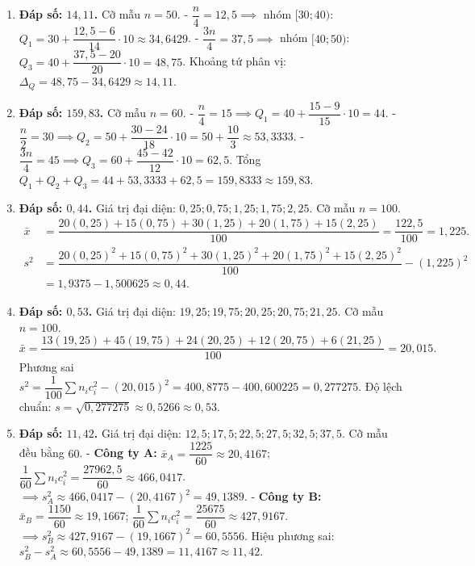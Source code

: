 \documentclass[12pt,a4paper]{article}
\begin{document}
\begin{enumerate}[start=11]
\item \textbf{Đáp số: $14{,}11$.}  
Cỡ mẫu $n = 50$.  
- $\dfrac{n}{4} = 12{,}5 \implies$ nhóm $[30; 40)$: $Q_1 = 30 + \dfrac{12{,}5 - 6}{14} \cdot 10 \approx 34{,}6429$.  
- $\dfrac{3n}{4} = 37{,}5 \implies$ nhóm $[40; 50)$: $Q_3 = 40 + \dfrac{37{,}5 - 20}{20} \cdot 10 = 48{,}75$.  
Khoảng tứ phân vị: $\Delta_Q = 48{,}75 - 34{,}6429 \approx 14{,}11$.

\item \textbf{Đáp số: $159{,}83$.}  
Cỡ mẫu $n = 60$.  
- $\dfrac{n}{4} = 15 \implies Q_1 = 40 + \dfrac{15 - 9}{15} \cdot 10 = 44$.  
- $\dfrac{n}{2} = 30 \implies Q_2 = 50 + \dfrac{30 - 24}{18} \cdot 10 = 50 + \dfrac{10}{3} \approx 53{,}3333$.  
- $\dfrac{3n}{4} = 45 \implies Q_3 = 60 + \dfrac{45 - 42}{12} \cdot 10 = 62{,}5$.  
Tổng $Q_1 + Q_2 + Q_3 = 44 + 53{,}3333 + 62{,}5 = 159{,}8333 \approx 159{,}83$.

\item \textbf{Đáp số: $0{,}44$.}  
Giá trị đại diện: $0{,}25; 0{,}75; 1{,}25; 1{,}75; 2{,}25$. Cỡ mẫu $n = 100$.  
\begin{align*}
\bar{x} &= \dfrac{20(0{,}25) + 15(0{,}75) + 30(1{,}25) + 20(1{,}75) + 15(2{,}25)}{100} = \dfrac{122{,}5}{100} = 1{,}225. \\
s^2 &= \dfrac{20(0{,}25)^2 + 15(0{,}75)^2 + 30(1{,}25)^2 + 20(1{,}75)^2 + 15(2{,}25)^2}{100} - (1{,}225)^2 \\
&= 1{,}9375 - 1{,}500625 \approx 0{,}44.
\end{align*}

\item \textbf{Đáp số: $0{,}53$.}  
Giá trị đại diện: $19{,}25; 19{,}75; 20{,}25; 20{,}75; 21{,}25$. Cỡ mẫu $n = 100$.  
\[
\bar{x} = \dfrac{13(19{,}25) + 45(19{,}75) + 24(20{,}25) + 12(20{,}75) + 6(21{,}25)}{100} = 20{,}015.
\]
Phương sai $s^2 = \dfrac{1}{100}\sum n_i c_i^2 - (20{,}015)^2 = 400{,}8775 - 400{,}600225 = 0{,}277275$.  
Độ lệch chuẩn: $s = \sqrt{0{,}277275} \approx 0{,}5266 \approx 0{,}53$.

\item \textbf{Đáp số: $11{,}42$.}  
Giá trị đại diện: $12{,}5; 17{,}5; 22{,}5; 27{,}5; 32{,}5; 37{,}5$. Cỡ mẫu đều bằng $60$.  
- \textbf{Công ty A:} $\bar{x}_A = \dfrac{1225}{60} \approx 20{,}4167$; $\dfrac{1}{60}\sum n_i c_i^2 = \dfrac{27962{,}5}{60} \approx 466{,}0417$.  
  $\implies s_A^2 \approx 466{,}0417 - (20{,}4167)^2 = 49{,}1389$.  
- \textbf{Công ty B:} $\bar{x}_B = \dfrac{1150}{60} \approx 19{,}1667$; $\dfrac{1}{60}\sum n_i c_i^2 = \dfrac{25675}{60} \approx 427{,}9167$.  
  $\implies s_B^2 \approx 427{,}9167 - (19{,}1667)^2 = 60{,}5556$.  
Hiệu phương sai: $s_B^2 - s_A^2 \approx 60{,}5556 - 49{,}1389 = 11{,}4167 \approx 11{,}42$.


\end{enumerate}
\end{document}
